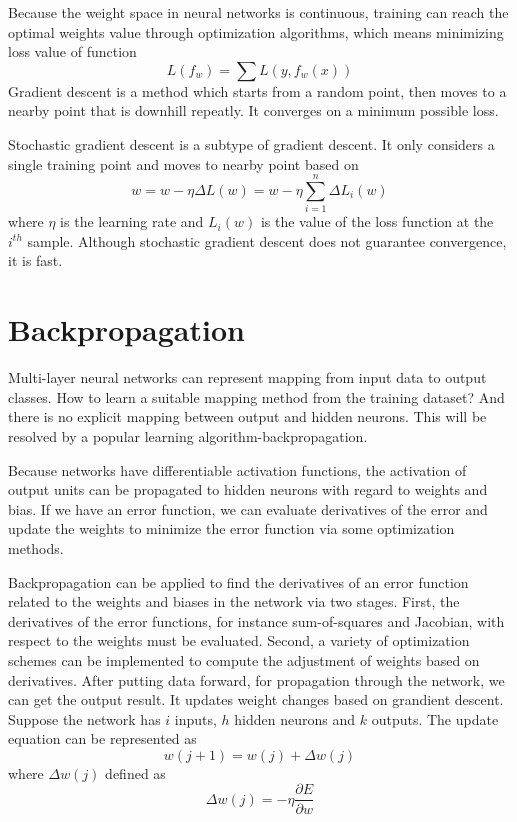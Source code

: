Because the weight space in neural networks is continuous, training can reach the optimal weights value through optimization algorithms, which means minimizing loss value of function
\begin{equation}\label{eq:LossMin}
L(f_{w}) = \sum L(y, f_{w}(x))
\end{equation}
Gradient descent is a method which starts from a random point, then moves to a nearby point that is downhill repeatly. It converges on a minimum possible loss.

Stochastic gradient descent is a subtype of gradient descent. It only considers a single training point and moves to nearby point based on
\begin{equation}\label{eq:SGDUpdate}
w = w - \eta  \Delta L(w) = w - \eta \sum_{i=1}^{n} \Delta L_{i}(w)
\end{equation}
where $\eta$ is the learning rate and $L_{i}(w)$ is the value of the loss function at the $i^{th}$ sample. Although stochastic gradient descent does not guarantee convergence, it is fast.

\section{Backpropagation}

Multi-layer neural networks can represent mapping from input data to output classes. How to learn a suitable mapping method from the training dataset? And there is no explicit mapping between output and hidden neurons. This will be resolved by a popular learning algorithm-backpropagation.

Because networks have differentiable activation functions, the activation of output units can be propagated to hidden neurons with regard to weights and bias. If we have an error function, we can evaluate derivatives of the error and update the weights to minimize the error function via some optimization methods.

Backpropagation can be applied to find the derivatives of an error function related to the weights and biases in the network via two stages. First, the derivatives of the error functions, for instance sum-of-squares and Jacobian, with respect to the weights must be evaluated. Second, a variety of optimization schemes can be implemented to compute the adjustment of weights based on derivatives. After putting data forward, for propagation through the network, we can get the output result. It updates weight changes based on grandient descent. Suppose the network has $i$ inputs, $h$ hidden neurons and $k$ outputs. The update equation can be represented as 
\begin{equation}\label{eq:UpdateWeights}
w(j+1) = w(j) + \Delta w(j)
\end{equation}
where $\Delta w(j)$ defined as 
\begin{equation}\label{eq:DeltaWeights}
\Delta w(j) = -\eta \frac{\partial E}{\partial w}
\end{equation}

